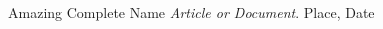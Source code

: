 \begin{thebibliography}{10}

        Amazing Complete Name
        \textit{Article or Document}. 
        Place, Date

\end{thebibliography}






